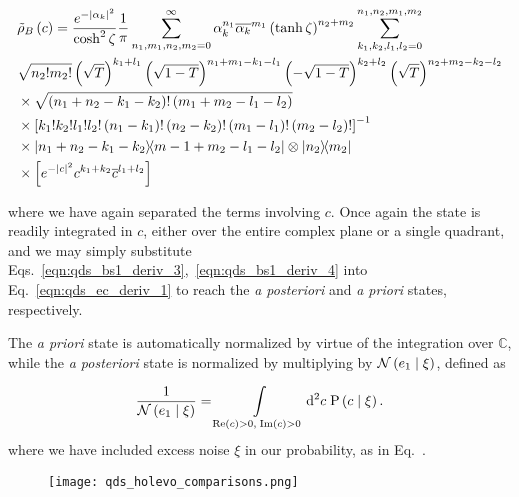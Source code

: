 \begin{align}\label{eqn:qds_ec_deriv_1}
&\tilde{\rho}_{B}\left(c\right) =  \frac{e^{-\left|\alpha_k\right|^2}}{\cosh^2\zeta} \frac{1}{\pi} \sum_{n_1, m_1, n_2, m_2 = 0}^\infty \alpha_k^{n_1} \overline{\alpha_k}^{m_1} \left(\tanh\zeta\right)^{n_2 + m_2} \sum_{k_1, k_2, l_1, l_2 = 0}^{n_1, n_2, m_1, m_2}  \notag \\
%
&\sqrt{n_2! m_2!} \left(\sqrt{T}\right)^{k_1 + l_1} \left(\sqrt{1-T}\right)^{n_1 + m_1 - k_1 - l_1} \left(-\sqrt{1-T}\right)^{k_2 + l_2} \left(\sqrt{T}\right)^{n_2 + m_2 - k_2 - l_2} \notag \\
%
&\times \sqrt{\left(n_1 + n_2 - k_1 - k_2\right)! \left(m_1 + m_2 - l_1 - l_2\right)} \notag \\
%
&\times \left[k_1! k_2! l_1! l_2! \left(n_1 - k_1\right)! \left(n_2 - k_2\right)! \left(m_1 - l_1\right)! \left(m_2 - l_2\right)! \right]^{-1} \notag \\
%
&\times \dyad{n_1 + n_2 - k_1 - k_2}{m-1 + m_2 - l_1 - l_2} \otimes \dyad{n_2}{m_2} \notag \\
%
&\times \left[e^{-\left|c\right|^2} c^{k_1 + k_2} \overline{c}^{l_1 + l_2} \right]
\end{align}

\noindent where we have again separated the terms involving $c$. Once again the state is readily integrated in $c$, either over the entire complex plane or a single quadrant, and we may simply substitute Eqs.~\ref{eqn:qds_bs1_deriv_3},~\ref{eqn:qds_bs1_deriv_4} into Eq.~\ref{eqn:qds_ec_deriv_1} to reach the \emph{a posteriori} and \emph{a priori} states, respectively.

The \emph{a priori} state is automatically normalized by virtue of the integration over $\mathbb{C}$, while the \emph{a posteriori} state is normalized by multiplying by $\mathcal{N}\left(e_1 \; \middle| \; \xi \right)$, defined as 

\begin{equation}
\frac{1}{\mathcal{N}\left(e_1 \; \middle| \; \xi\right)} = \int\limits_{\text{Re}\left(c\right) > 0, \; \text{Im}\left(c\right)>0} \mathop{}\!\mathrm{d^2} c \; \text{P}\left(c \; \middle| \; \xi \right).
\end{equation}
where we have included excess noise $\xi$ in our probability, as in Eq.~.




\begin{figure}
\texttt{[image: qds\_holevo\_comparisons.png]}
\caption{\label{fig:qds_holevo_comparisons}}
\end{figure}


